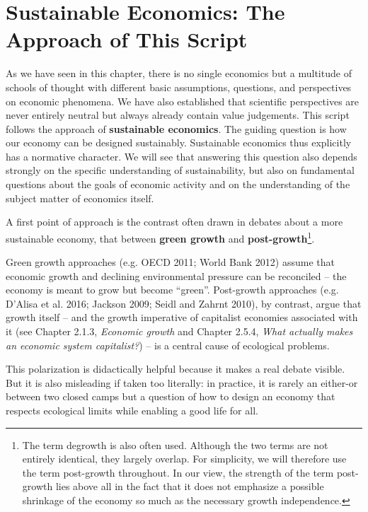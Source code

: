 \documentclass[
  british,
  a4paper,
  DIV=11,
  numbers=noendperiod,
  oneside,
  openany]{scrreprt}
\begin{document}
\section{Sustainable Economics: The Approach of This
Script}\label{sustainable-economics-the-approach-of-this-script}

As we have seen in this chapter, there is no single economics but a
multitude of schools of thought with different basic assumptions,
questions, and perspectives on economic phenomena. We have also
established that scientific perspectives are never entirely neutral but
always already contain value judgements. This script follows the
approach of \textbf{sustainable economics}. The guiding question is how
our economy can be designed sustainably. Sustainable economics thus
explicitly has a normative character. We will see that answering this
question also depends strongly on the specific understanding of
sustainability, but also on fundamental questions about the goals of
economic activity and on the understanding of the subject matter of
economics itself.

A first point of approach is the contrast often drawn in debates about a
more sustainable economy, that between \textbf{green growth} and
\textbf{post-growth}\footnote{The term degrowth is also often used.
  Although the two terms are not entirely identical, they largely
  overlap. For simplicity, we will therefore use the term post-growth
  throughout. In our view, the strength of the term post-growth lies
  above all in the fact that it does not emphasize a possible shrinkage
  of the economy so much as the necessary growth independence.}.

Green growth approaches (e.g. OECD 2011; World Bank 2012) assume that
economic growth and declining environmental pressure can be reconciled
-- the economy is meant to grow but become ``green''. Post-growth
approaches (e.g. D'Alisa et al. 2016; Jackson 2009; Seidl and Zahrnt
2010), by contrast, argue that growth itself -- and the growth
imperative of capitalist economies associated with it (see Chapter
2.1.3, \emph{Economic growth} and Chapter 2.5.4, \emph{What actually
makes an economic system capitalist?}) -- is a central cause of
ecological problems.

This polarization is didactically helpful because it makes a real debate
visible. But it is also misleading if taken too literally: in practice,
it is rarely an either-or between two closed camps but a question of how
to design an economy that respects ecological limits while enabling a
good life for all.
\end{document}
